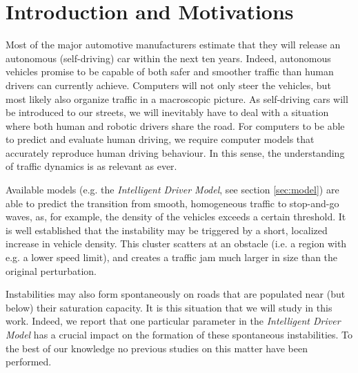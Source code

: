 \section{Introduction and Motivations}
Most of the major automotive manufacturers estimate that they will release an autonomous (self-driving) car within the next ten years. Indeed, autonomous vehicles promise to be capable of both safer and smoother traffic than human drivers can currently achieve. Computers will not only steer the vehicles, but most likely also organize traffic in a macroscopic picture. As self-driving cars will be introduced to our streets, we will inevitably have to deal with a situation where both human and robotic drivers share the road. For computers to be able to predict and evaluate human driving, we require computer models that accurately reproduce human driving behaviour. In this sense, the understanding of traffic dynamics is as relevant as ever.

Available models (e.g. the \emph{Intelligent Driver Model}, see section \ref{sec:model}) are able to predict the transition from smooth, homogeneous traffic to stop-and-go waves, as, for example, the density of the vehicles exceeds a certain threshold. It is well established \cite{treiber1999, treiber2000, treiber2013} that the instability may be triggered by a short, localized increase in vehicle density. This cluster scatters at an obstacle (i.e. a region with e.g. a lower speed limit), and creates a traffic jam much larger in size than the original perturbation.

Instabilities may also form spontaneously on roads that are populated near (but below) their saturation capacity. It is this situation that we will study in this work. Indeed, we report that one particular parameter in the \emph{Intelligent Driver Model} has a crucial impact on the formation of these spontaneous instabilities. To the best of our knowledge no previous studies on this matter have been performed.

